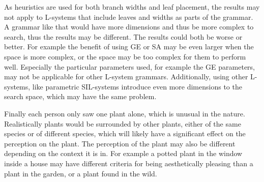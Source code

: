 As heuristics are used for both branch widths and leaf placement, the results may not apply to L-systems that include leaves and widths as parts of the grammar.
A grammar like that would have more dimensions and thus be more complex to search, thus the results may be different.
The results could both be worse or better.
For example the benefit of using GE or SA may be even larger when the space is more complex, or the space may be too complex for them to perform well.
Especially the particular parameters used, for example the GE parameters, may not be applicable for other L-system grammars.
Additionally, using other L-systems, like parametric SIL-systems introduce even more dimensions to the search space, which may have the same problem.

Finally each person only saw one plant alone, which is unusual in the nature.
Realistically plants would be surrounded by other plants, either of the same species or of different species, which will likely have a significant effect on the perception on the plant.
The perception of the plant may also be different depending on the context it is in.
For example a potted plant in the window inside a house may have different criteria for being aesthetically pleasing than a plant in the garden, or a plant found in the wild.

